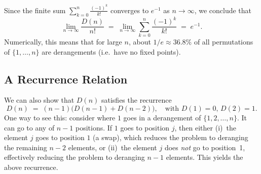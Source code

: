 \documentclass[docmute]{article}
\begin{document}
Since the finite sum \(\sum_{k=0}^{n} \frac{(-1)^k}{k!}\) converges to \(e^{-1}\) as \(n \to \infty\), we conclude that
\[
\lim_{n\to\infty} \frac{D(n)}{n!} 
\;=\; \lim_{n\to\infty} 
\sum_{k=0}^{n} \frac{(-1)^k}{k!}
\;=\;
e^{-1}.
\]
Numerically, this means that for large \(n\), about \(1/e \approx 36.8\%\) of all permutations of \(\{1,\dots,n\}\) are derangements (i.e.\ have no fixed points).


\subsection*{A Recurrence Relation}
We can also show that $D(n)$ satisfies the recurrence
\[
D(n) \;=\; (n-1)\bigl(D(n-1) + D(n-2)\bigr),
\quad \text{with } D(1)=0, \,D(2)=1.
\]
One way to see this: consider where $1$ goes in a derangement of $\{1,2,\ldots,n\}$. It can go to any of $n-1$ positions. If $1$ goes to position $j$, then either (i)~the element $j$ goes to position $1$ (a swap), which reduces the problem to deranging the remaining $n-2$ elements, or (ii)~the element $j$ does \emph{not} go to position~1, effectively reducing the problem to deranging $n-1$ elements. This yields the above recurrence.
\end{document}
